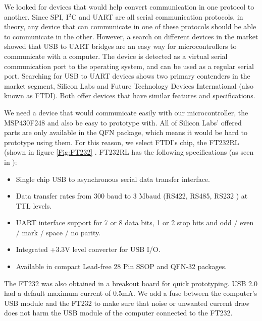 We looked for devices that would help convert communication in one protocol to another. Since SPI, I$^2$C and UART are all serial communication protocols, in theory, any device that can communicate in one of these protocols should be able to communicate in the other. However, a search on different devices in the market showed that USB to UART bridges are an easy way for microcontrollers to communicate with a computer. The device is detected as a virtual serial communication port to the operating system, and can be used as a regular serial port. Searching for USB to UART devices shows two primary contenders in the market segment, Silicon Labs and Future Technology Devices International (also known as FTDI). Both offer devices that have similar features and specifications. 

We need a device that would communicate easily with our microcontroller, the MSP430F248 and also be easy to prototype with. All of Silicon Labs' offered parts are only available in the QFN package, which means it would be hard to prototype using them. For this reason, we select FTDI's chip, the FT232RL (shown in figure \ref{Fig:FT232} \cite{Web:FTIMG}. FT232RL has the following specifications (as seen in \cite{FT232Datasheet}):

\begin{itemize}
	\item Single chip USB to asynchronous serial data transfer interface.
	\item Data transfer rates from 300 baud to 3 Mbaud (RS422, RS485, RS232 ) at TTL levels.
	\item UART interface support for 7 or 8 data bits, 1 or 2 stop bits and odd / even / mark / space / no parity.
	\item Integrated +3.3V level converter for USB I/O.
	\item Available in compact Lead-free 28 Pin SSOP and QFN-32 packages.
\end{itemize}

The FT232 was also obtained in a breakout board for quick prototyping.
USB 2.0 had a default maximum current of 0.5mA. We add a fuse between the computer's USB module and the FT232 to make sure that noise or unwanted current draw does not harm the USB module of the computer connected to the FT232.


